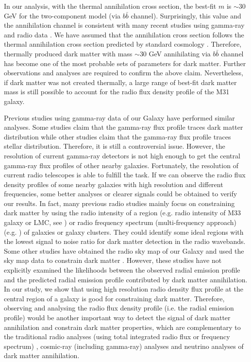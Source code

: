 \documentclass[useAMS,usenatbib]{mn2e}
\begin{document}
In our analysis, with the thermal annihilation cross section, the best-fit $m$ is $\sim 30$ GeV for the two-component model (via $b\bar{b}$ channel). Surprisingly, this value and the annihilation channel is consistent with many recent studies using gamma-ray \citep{Daylan,Brown,Brown2} and radio data \citep{Chan4}. We have assumed that the annihilation cross section follows the thermal annihilation cross section predicted by standard cosmology \citep{Steigman}. Therefore, thermally produced dark matter with mass $\sim 30$ GeV annihilating via $b\bar{b}$ channel has become one of the most probable sets of parameters for dark matter. Further observations and analyses are required to confirm the above claim. Nevertheless, if dark matter was not created thermally, a large range of best-fit dark matter mass is still possible to account for the radio flux density profile of the M31 galaxy.

Previous studies using gamma-ray data of our Galaxy have performed similar analyses. Some studies claim that the gamma-ray flux profile traces dark matter distribution while other studies claim that the gamma-ray flux profile traces stellar distribution. Therefore, it is still a controversial issue. However, the resolution of current gamma-ray detectors is not high enough to get the central gamma-ray flux profiles of other nearby galaxies. Fortunately, the resolution of current radio telescopes is able to fulfill the task. If we can observe the radio flux density profiles of some nearby galaxies with high resolution and different frequencies, some better analyses or clearer signals could be obtained to verify our results. In fact, many previous radio studies mainly focus on constraining dark matter by using the radio intensity of a region (e.g. radio intensity of M33 galaxy or LMC, see \citet{Borriello2,Siffert}) or radio frequency spectrum (multi-frequency approach) (e.g. \citet{Tasitsiomi,Chan}) of galaxies or galaxy clusters. They could identify some ideal regions with the lowest signal to noise ratio for dark matter detection in the radio wavebands. Some other studies have obtained the radio sky map of our Galaxy and used the sky map data to constrain dark matter \citep{Borriello}. However, these studies have not explicitly examined the likelihoods between the observed radial emission profile and the predicted radial emission profile contributed by dark matter annihilation. In our study, we show that using high resolution radio density flux profile at the central region of a galaxy is good for constraining dark matter. Therefore, observing and analysing the radio flux density profile (i.e. the radial emission profile) would be another important way to detect the signal of dark matter annihilation and constrain dark matter properties, which are complementary to the traditional radio analyses (using total integrated radio flux or frequency spectrum) \citep{Blasi,Aloisio,Tasitsiomi,Borriello,Chan}, cosmic-ray (including gamma-ray) analyses \citep{Ackermann,Abdallah,Ambrosi,Aguilar} and neutrino analyses \citep{Albert} of dark matter annihilation.
\end{document}
